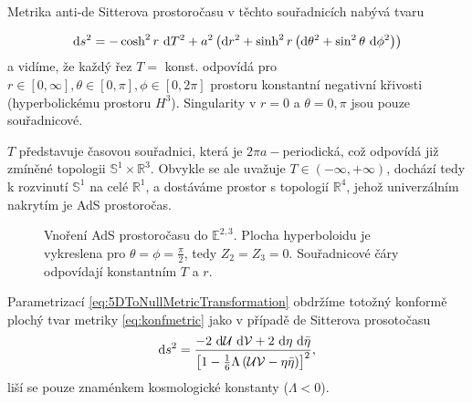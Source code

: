 Metrika anti-de Sitterova prostoročasu v těchto souřadnicích nabývá tvaru

\begin{equation}
     \mathrm{d} s^2 = - \cosh^2 r ~ \mathrm{d} T^2 + a^2 \left( \mathrm{d} r^2 + \sinh^2 r \left( \mathrm{d} \theta^2 + \sin^2 \theta ~ \mathrm{d} \phi^2 \right) \right)
\end{equation}
a vidíme, že každý řez $T =$ konst. odpovídá pro $r\in\left[0, \infty\right], \theta \in \left[0, \pi\right], \phi \in \left[0, 2\pi\right]$
prostoru konstantní negativní křivosti (hyperbolickému prostoru $H^3$).
Singularity v $r = 0$ a $\theta = 0, \pi$ jsou pouze souřadnicové.

$T$ představuje časovou souřadnici, která je $2 \pi a-$periodická, což odpovídá již zmíněné topologii $\mathbb{S}^1 \times \mathbb{R}^3$.
Obvykle se ale uvažuje $T \in \left(-\infty, +\infty\right)$, dochází tedy k rozvinutí $\mathbb{S}^1$ na celé $\mathbb{R}^1$, a dostáváme
prostor s topologií $\mathbb{R}^4$, jehož univerzálním nakrytím je AdS prostoročas.


\begin{figure}[H]
     \centering
     \caption{Vnoření AdS prostoročasu do $\mathbb{E}^{2,3}$. Plocha hyperboloidu je vykreslena pro $\theta=\phi=\frac{\pi}{2}$, tedy $Z_2 = Z_3 = 0$. Souřadnicové čáry odpovídají konstantním $T$ a $r$.}
\end{figure}

Parametrizací \eqref{eq:5DToNullMetricTransformation} obdržíme totožný konformě plochý tvar metriky \eqref{eq:konfmetric} jako
v případě de Sitterova prosotočasu
\begin{equation*}
     \mathrm{d} s^2 = \frac{-2 ~ \mathrm{d} \mathcal{U} ~ \mathrm{d} \mathcal{V} + 2 ~ \mathrm{d} \eta ~ \mathrm{d} \bar{\eta}}{\left[1-\tfrac{1}{6} \Lambda \left(\mathcal{U} \mathcal{V} - \eta \bar{\eta}\right)\right]^2},
\end{equation*}
liší se pouze znaménkem kosmologické konstanty ($\Lambda<0$).